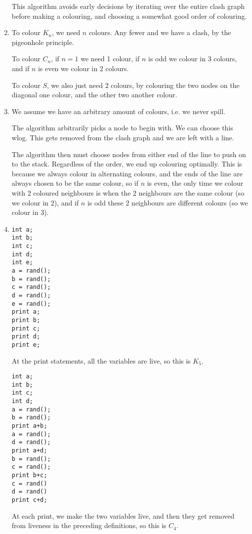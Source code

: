 \begin{enumerate}[label=(\alph*)]
    This algorithm avoids early decisions by iterating over the entire clash graph before making a colouring, and choosing a somewhat good order of colouring.

  \item
    To colour $K_n$, we need $n$ colours. Any fewer and we have a clash, by the pigeonhole principle.

    To colour $C_n$, if $n=1$ we need 1 colour, if $n$ is odd we colour in 3 colours, and if $n$ is even we colour in 2 colours.

    To colour $S$, we also just need $2$ colours, by colouring the two nodes on the diagonal one colour, and the other two another colour.

  \item

    We assume we have an arbitrary amount of colours, i.e. we never spill.

    The algorithm arbitrarily picks a node to begin with. We can choose this wlog. This gets removed from the clash graph and we are left with a line.

    The algorithm then must choose nodes from either end of the line to push on to the stack. Regardless of the order, we end up colouring optimally. This is because we always colour in alternating colours, and the ends of the line are always chosen to be the same colour, so if $n$ is even, the only time we colour with 2 coloured neighbours is when the 2 neighbours are the same colour (so we colour in 2), and if $n$ is odd these 2 neighbours are different colours (so we colour in 3).

  \item
\begin{verbatim}
int a;
int b;
int c;
int d;
int e;
a = rand();
b = rand();
c = rand();
d = rand();
e = rand();
print a;
print b;
print c;
print d;
print e;
\end{verbatim}

At the print statements, all the variables are live, so this is $K_5$.

\begin{verbatim}
int a;
int b;
int c;
int d;
a = rand();
b = rand();
print a+b;
a = rand();
d = rand();
print a+d;
b = rand();
c = rand();
print b+c;
c = rand()
d = rand()
print c+d;
\end{verbatim}

At each print, we make the two variables live, and then they get removed from liveness in the preceding definitions, so this is $C_4$.


\end{enumerate}
